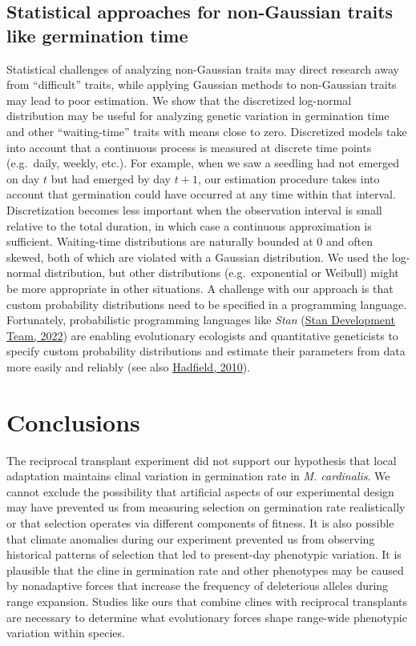 \documentclass[
  12pt,
]{article}
\begin{document}
\hypertarget{statistical-approaches-for-non-gaussian-traits-like-germination-time}{%
\subsection{Statistical approaches for non-Gaussian traits like germination time}\label{statistical-approaches-for-non-gaussian-traits-like-germination-time}}

Statistical challenges of analyzing non-Gaussian traits may direct research away from ``difficult'' traits, while applying Gaussian methods to non-Gaussian traits may lead to poor estimation. We show that the discretized log-normal distribution may be useful for analyzing genetic variation in germination time and other ``waiting-time'' traits with means close to zero. Discretized models take into account that a continuous process is measured at discrete time points (e.g.~daily, weekly, etc.). For example, when we saw a seedling had not emerged on day \(t\) but had emerged by day \(t+1\), our estimation procedure takes into account that germination could have occurred at any time within that interval. Discretization becomes less important when the observation interval is small relative to the total duration, in which case a continuous approximation is sufficient. Waiting-time distributions are naturally bounded at \(0\) and often skewed, both of which are violated with a Gaussian distribution. We used the log-normal distribution, but other distributions (e.g.~exponential or Weibull) might be more appropriate in other situations. A challenge with our approach is that custom probability distributions need to be specified in a programming language. Fortunately, probabilistic programming languages like \emph{Stan} (\protect\hyperlink{ref-stan_development_team_stan_2022}{Stan Development Team, 2022}) are enabling evolutionary ecologists and quantitative geneticists to specify custom probability distributions and estimate their parameters from data more easily and reliably (see also \protect\hyperlink{ref-hadfield_mcmc_2010}{Hadfield, 2010}).

\hypertarget{conclusions}{%
\section{Conclusions}\label{conclusions}}

The reciprocal transplant experiment did not support our hypothesis that local adaptation maintains clinal variation in germination rate in \emph{M. cardinalis}. We cannot exclude the possibility that artificial aspects of our experimental design may have prevented us from measuring selection on germination rate realistically or that selection operates via different components of fitness. It is also possible that climate anomalies during our experiment prevented us from observing historical patterns of selection that led to present-day phenotypic variation. It is plausible that the cline in germination rate and other phenotypes may be caused by nonadaptive forces that increase the frequency of deleterious alleles during range expansion. Studies like ours that combine clines with reciprocal transplants are necessary to determine what evolutionary forces shape range-wide phenotypic variation within species.
\end{document}
